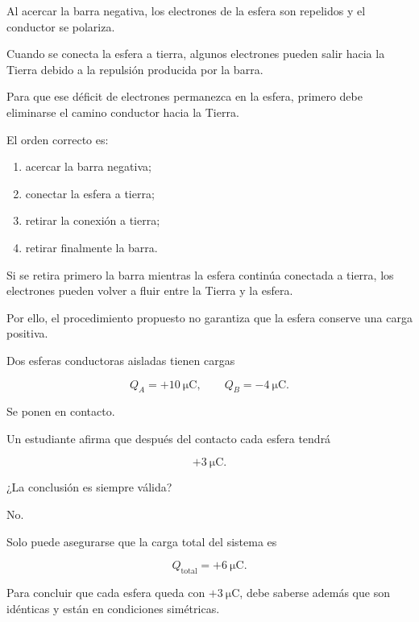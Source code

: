 \begin{explicacion}

Al acercar la barra negativa, los electrones de la esfera son repelidos y el
conductor se polariza.

Cuando se conecta la esfera a tierra, algunos electrones pueden salir hacia
la Tierra debido a la repulsión producida por la barra.

Para que ese déficit de electrones permanezca en la esfera, primero debe
eliminarse el camino conductor hacia la Tierra.

El orden correcto es:

\begin{enumerate}
    \item acercar la barra negativa;
    \item conectar la esfera a tierra;
    \item retirar la conexión a tierra;
    \item retirar finalmente la barra.
\end{enumerate}

Si se retira primero la barra mientras la esfera continúa conectada a tierra,
los electrones pueden volver a fluir entre la Tierra y la esfera.

Por ello, el procedimiento propuesto no garantiza que la esfera conserve una
carga positiva.

\end{explicacion}



\begin{ejercicio}

Dos esferas conductoras aisladas tienen cargas

\[
Q_A=+\SI{10}{\micro\coulomb},
\qquad
Q_B=-\SI{4}{\micro\coulomb}.
\]

Se ponen en contacto.

Un estudiante afirma que después del contacto cada esfera tendrá

\[
+\SI{3}{\micro\coulomb}.
\]

¿La conclusión es siempre válida?

\end{ejercicio}

\begin{respuesta}

No.

Solo puede asegurarse que la carga total del sistema es

\[
\boxed{
Q_{\text{total}}=+\SI{6}{\micro\coulomb}
}.
\]

Para concluir que cada esfera queda con
\(+\SI{3}{\micro\coulomb}\), debe saberse además que son idénticas y están
en condiciones simétricas.

\end{respuesta}

